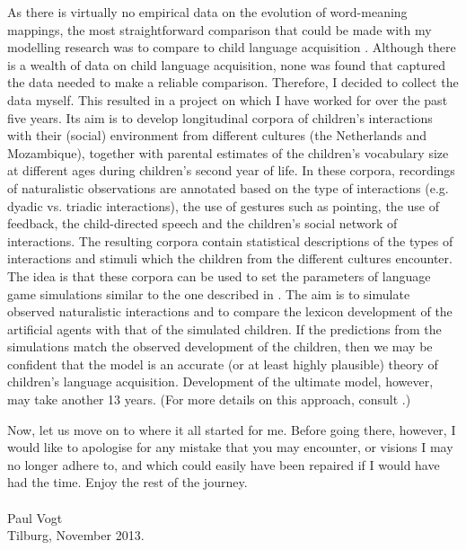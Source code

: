 As there is virtually no empirical data on the evolution of word-meaning mappings, the most straightforward comparison that could be made with my modelling research was to compare to child language acquisition \citep{vogtlieven:2010}. Although there is a wealth of data on child language acquisition, none was found that captured the data needed to make a reliable comparison. Therefore, I decided to collect the data myself. This resulted in a project on which I have worked for over the past five years. Its aim is to develop longitudinal corpora of children's interactions with their (social) environment from different cultures (the Netherlands and Mozambique), together with parental estimates of the children's vocabulary size at different ages during children's second year of life. In these corpora, recordings of naturalistic observations are annotated based on the type of interactions (e.g. dyadic vs. triadic interactions), the use of gestures such as pointing, the use of feedback, the child-directed speech and the children's social network of interactions. The resulting corpora  contain statistical descriptions of the types of interactions and stimuli which the children from the different cultures encounter. The idea is that these corpora can be used to set the parameters of language game simulations similar to the one described in \citet{vogthaasdijk:2010}. The aim is to simulate observed naturalistic interactions and to compare the lexicon development of the artificial agents with that of the simulated children. If the predictions from the simulations match the observed development of the children, then we may be confident that the model is an accurate (or at least highly plausible) theory of children's language acquisition. Development of the ultimate model, however, may take another 13 years. (For more details on this approach, consult \citealt{vogtmastin:2013}.)

 
Now, let us move on to where it all started for me. Before going there, however, I would like to apologise for any mistake that you may encounter, or visions I may no longer adhere to, and which could easily have been repaired if I would have had the time. Enjoy the rest of the journey.\\
\\
\noindent Paul Vogt\\
\noindent Tilburg, November 2013.
